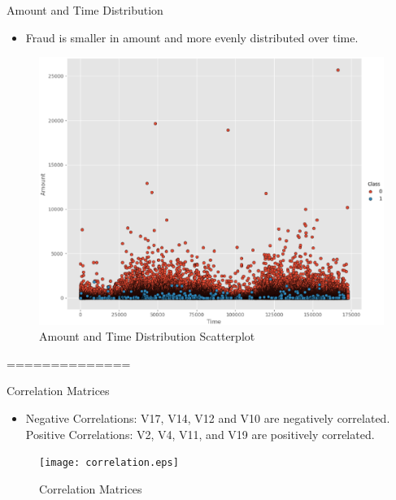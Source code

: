 \documentclass[
 size=14pt,
 paper=smartboard,  %
 mode=present, 		%
 display=slides, 	%
 style=tuliplab,  	%
 pauseslide,
 fleqn,leqno]{powerdot}
\begin{document}
\begin{slide}[toc=,bm=]{Amount and Time Distribution}
\begin{itemize}
	\item
	Fraud is smaller in amount and more evenly distributed over time.
\end{itemize}
\begin{figure}
  \centering
  \includegraphics[scale=0.45]{amounttime.eps}
  \caption{Amount and Time Distribution Scatterplot}\label{fig:OutAspect-target}
\end{figure}
\end{slide}


==============
\begin{slide}[toc=,bm=]{Correlation Matrices}
	
\begin{itemize}
	\item
 	Negative Correlations: V17, V14, V12 and V10 are negatively correlated.\\
 	Positive Correlations: V2, V4, V11, and V19 are positively correlated.
\end{itemize}
\begin{figure}
	\texttt{[image: correlation.eps]}
	\caption{Correlation Matrices}\label{fig:OutAspect-target}
\end{figure}

\end{slide}
\end{document}
